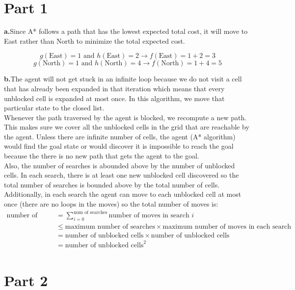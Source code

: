 \documentclass{article}
\begin{document}
\section*{Part 1}
\textbf{a.}\quad Since A* follows a path that has the lowest expected total cost, it will move to East rather than North to minimize the total expected cost. 

$$ g(\text{East})=1 \text{ and } h(\text{East}) = 2 \rightarrow f(\text{East})=1+2=3 $$
$$ g(\text{North})=1 \text{ and } h(\text{North})=4 \rightarrow f(\text{North})=1+4=5 $$

\textbf{b.}\quad The agent will not get stuck in an infinite loop because we do not visit a cell that has already been expanded in that iteration which means that every unblocked cell is expanded at most once. In this algorithm, we move that particular state to the closed list.\\
Whenever the path traversed by the agent is blocked, we recompute a new path. This makes sure we cover all the unblocked cells in the grid that are reachable by the agent. Unless there are infinite number of cells, the agent (A* algorithm) would find the goal state or would discover it is impossible to reach the goal because the there is no new path that gets the agent to the goal.\\
Also, the number of searches is abounded above by the number of unblocked cells. In each search, there is at least one new unblocked cell discovered so the total number of searches is bounded above by the total number of cells. Additionally, in each search the agent can move to each unblocked cell at most once (there are no loops in the moves) so the total number of moves is:
\begin{align*}
  \text{number of moves} &= \sum_{i = 0}^{\text{num of searches}} \text{number of moves in search } i\\
                         &\leq \text{maximum number of searches} \times \text{maximum number of moves in each search}\\
                         &= \text{number of unblocked cells} \times \text{number of unblocked cells}\\
                         &= \text{number of unblocked cells}^2\\
\end{align*}

\section*{Part 2}
\end{document}
